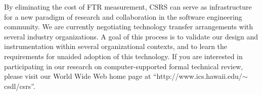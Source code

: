 By eliminating the cost of FTR measurement, CSRS can serve as
infrastructure for a new paradigm of research and collaboration in the
software engineering community.  We are currently negotiating technology
transfer arrangements with several industry organizations.  A goal of this
process is to validate our design and instrumentation within several
organizational contexts, and to learn the requirements for unaided adoption
of this technology.  If you are interested in participating in our research
on computer-supported formal technical review, please visit our World Wide
Web home page at ``http://www.ics.hawaii.edu/$\sim$csdl/csrs''.  


 



